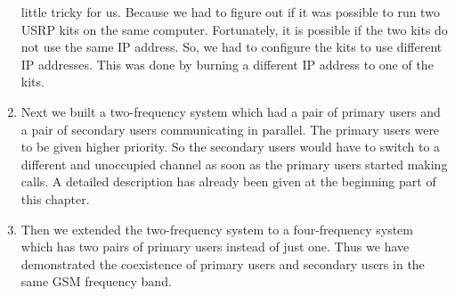 \begin{enumerate}
    little tricky for us. Because we had to figure out if it was possible to
    run two USRP kits on the same computer. Fortunately, it is possible if the
    two kits do not use the same IP address. So, we had to configure the kits
    to use different IP addresses. This was done by burning a different IP 
    address to one of the kits.
    \item Next we built a two-frequency system which had a pair of primary 
    users and a pair of secondary users communicating in parallel. The primary
    users were to be given higher priority. So the secondary users would have
    to switch to a different and unoccupied channel as soon as the primary 
    users started making calls. A detailed description has already been given
    at the beginning part of this chapter.
    \item Then we extended the two-frequency system to a four-frequency system
    which has two pairs of primary users instead of just one. Thus we have 
    demonstrated the coexistence of primary users and secondary users in the 
    same GSM frequency band.
\end{enumerate}



